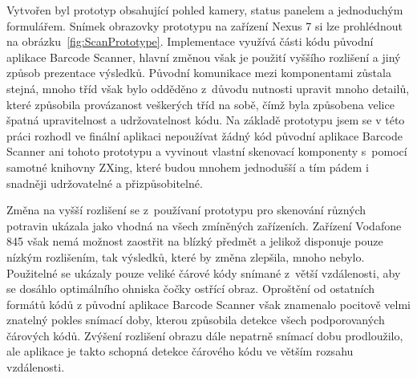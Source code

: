 \documentclass[thesis=B,czech]{FITthesis}[2013/10/20]
\begin{document}
Vytvořen byl prototyp obsahující pohled kamery, status panelem a jednoduchým formulářem. Snímek obrazovky prototypu na zařízení Nexus 7 si lze prohlédnout na obrázku~\ref{fig:ScanPrototype}. Implementace využívá části kódu původní aplikace Barcode Scanner, hlavní změnou však je použití vyššího rozlišení a jiný způsob prezentace výsledků. Původní komunikace mezi komponentami zůstala stejná, mnoho tříd však bylo odděděno z~důvodu nutnosti upravit mnoho detailů, které způsobila provázanost veškerých tříd na sobě, čímž byla způsobena velice špatná upravitelnost a udržovatelnost kódu. Na základě prototypu jsem se v této práci rozhodl ve finální aplikaci nepoužívat žádný kód původní aplikace Barcode Scanner ani tohoto prototypu a vyvinout vlastní skenovací komponenty s~pomocí samotné knihovny ZXing, které budou mnohem jednodušší a tím pádem i snadněji udržovatelné a přizpůsobitelné.

Změna na vyšší rozlišení se z~používaní prototypu pro skenování různých potravin ukázala jako vhodná na všech zmíněných zařízeních. Zařízení Vodafone 845 však nemá možnost zaostřit na blízký předmět a jelikož disponuje pouze nízkým rozlišením, tak výsledků, které by změna zlepšila, mnoho nebylo. Použitelné se ukázaly pouze veliké čárové kódy snímané z~větší vzdálenosti, aby se dosáhlo optimálního ohniska čočky ostřící obraz. Oproštění od ostatních formátů kódů z původní aplikace Barcode Scanner však znamenalo pocitově velmi znatelný pokles snímací doby, kterou způsobila detekce všech podporovaných čárových kódů. Zvýšení rozlišení obrazu dále nepatrně snímací dobu prodloužilo, ale aplikace je takto schopná detekce čárového kódu ve větším rozsahu vzdálenosti.
\end{document}
